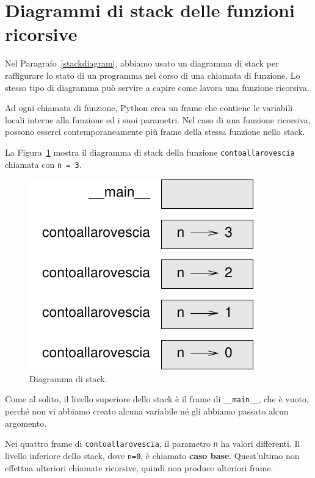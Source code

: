 \documentclass[10pt]{book}
\begin{document}
\section{Diagrammi di stack delle funzioni ricorsive}
\label{recursive.stack}

Nel Paragrafo~\ref{stackdiagram}, abbiamo usato un diagramma di stack per raffigurare lo stato di un programma nel corso di una chiamata di funzione. Lo stesso tipo di diagramma può servire a capire come lavora una funzione ricorsiva.

Ad ogni chiamata di funzione, Python crea un frame che contiene le variabili locali interne alla funzione ed i suoi parametri. Nel caso di una funzione ricorsiva, possono esserci contemporaneamente più frame della stessa funzione nello stack.

La Figura~\ref{fig.stack2} mostra il diagramma di stack della funzione {\tt contoallarovescia} chiamata con {\tt n = 3}.

\begin{figure}
\centerline
{\includegraphics[scale=0.8]{figs/stack2.pdf}}
\caption{Diagramma di stack.}
\label{fig.stack2}
\end{figure}

Come al solito, il livello superiore dello stack è il frame di \verb"__main__", che
è vuoto, perché non vi abbiamo creato alcuna variabile né gli abbiamo passato alcun argomento.

Nei quattro frame di {\tt contoallarovescia}, il parametro {\tt n} ha valori differenti. Il livello inferiore dello stack, dove {\tt n=0}, è chiamato {\bf caso base}. Quest'ultimo non effettua ulteriori chiamate ricorsive, quindi non produce ulteriori frame.
\end{document}
